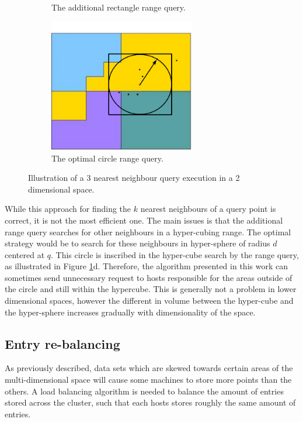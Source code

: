 \documentclass[11pt,a4paper]{globis-book}
\begin{document}
\begin{figure}[h]
\begin{subfigure}[b]{0.4\linewidth}
        \caption{The additional rectangle range query.}
    \end{subfigure}%
    \qquad
    \begin{subfigure}[b]{0.4\linewidth}
        \includegraphics[width = 2.5in]{images/zordering-knn-d}
        \caption{The optimal circle range query.}
    \end{subfigure}
    \caption{Illustration of a 3 nearest neighbour query execution in a 2 dimensional space. }
    \label{fig:knn}
\end{figure}

While this approach for finding the $k$ nearest neighbours of a query point is correct, it is not the most efficient one. The main issues is that the additional range query searches for other neighbours in a hyper-cubing range. The optimal strategy would be to search for these neighbours in hyper-sphere of radius $d$ centered at $q$. This circle is inscribed in the hyper-cube search by the range query, as illustrated in Figure \ref{fig:knn}d. Therefore, the algorithm presented in this work can sometimes send unnecessary request to hosts responsible for the areas outside of the circle and still within the hypercube. This is generally not a problem in lower dimensional spaces, however the different in volume between the hyper-cube and the hyper-sphere increases gradually with dimensionality of the space. 

\subsection{Entry re-balancing}

As previously described, data sets which are skewed towards certain areas of the multi-dimensional space will cause some machines to store more points than the others. A load balancing algorithm is needed to balance the amount of entries stored across the cluster, such that each hosts stores roughly the same amount of entries. 
\end{document}

